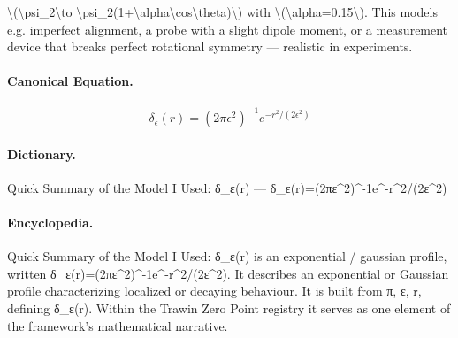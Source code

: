\textbackslash{}(\textbackslash{}psi\_2\textbackslash{}to \textbackslash{}psi\_2(1+\textbackslash{}alpha\textbackslash{}cos\textbackslash{}theta)\textbackslash{}) with \textbackslash{}(\textbackslash{}alpha=0.15\textbackslash{}). This models e.g. imperfect alignment, a probe with a slight dipole moment, or a measurement device that breaks perfect rotational symmetry — realistic in experiments.

\paragraph{Canonical Equation.}
\[
\delta_\epsilon(r)=(2\pi\epsilon^2)^{-1}e^{-r^2/(2\epsilon^2)}
\]

\paragraph{Dictionary.}
Quick Summary of the Model I Used: δ\_ε(r) — δ\_ε(r)=(2πε\textasciicircum{}2)\textasciicircum{}-1e\textasciicircum{}-r\textasciicircum{}2/(2ε\textasciicircum{}2)

\paragraph{Encyclopedia.}
Quick Summary of the Model I Used: δ\_ε(r) is an exponential / gaussian profile, written δ\_ε(r)=(2πε\textasciicircum{}2)\textasciicircum{}-1e\textasciicircum{}-r\textasciicircum{}2/(2ε\textasciicircum{}2). It describes an exponential or Gaussian profile characterizing localized or decaying behaviour. It is built from π, ε, r, defining δ\_ε(r). Within the Trawin Zero Point registry it serves as one element of the framework's mathematical narrative.
